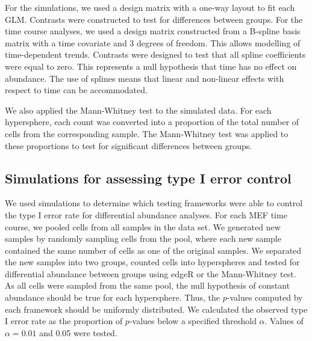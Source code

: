\documentclass{article}
\begin{document}
For the simulations, we used a design matrix with a one-way layout to fit each GLM.
Contrasts were constructed to test for differences between groups.
For the time course analyses, we used a design matrix constructed from a B-spline basis matrix with a time covariate and 3 degrees of freedom.
This allows modelling of time-dependent trends.
Contrasts were designed to test that all spline coefficients were equal to zero.
This represents a null hypothesis that time has no effect on abundance.
The use of splines means that linear and non-linear effects with respect to time can be accommodated.

We also applied the Mann-Whitney test to the simulated data.
For each hypersphere, each count was converted into a proportion of the total number of cells from the corresponding sample.
The Mann-Whitney test was applied to these proportions to test for significant differences between groups.

\subsection{Simulations for assessing type I error control}
We used simulations to determine which testing frameworks were able to control the type I error rate for differential abundance analyses.
For each MEF time course, we pooled cells from all samples in the data set.
We generated new samples by randomly sampling cells from the pool, where each new sample contained the same number of cells as one of the original samples.
We separated the new samples into two groups, counted cells into hyperspheres and tested for differential abundance between groups using edgeR or the Mann-Whitney test.
As all cells were sampled from the same pool, the null hypothesis of constant abundance should be true for each hypersphere.
Thus, the $p$-values computed by each framework should be uniformly distributed.
We calculated the observed type I error rate as the proportion of $p$-values below a specified threshold $\alpha$.
Values of $\alpha=0.01$ and 0.05 were tested.
\end{document}
